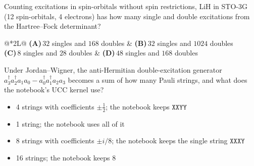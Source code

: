 \documentclass[11pt,a4paper]{article}
\newcommand{\optlabel}[1]{\textbf{(#1)}}
\newenvironment{qitem}[1]{\begin{list}{}{\setlength{\leftmargin}{3.3em}\setlength{\labelwidth}{3.1em}%
  \setlength{\labelsep}{0.2em}\setlength{\topsep}{3pt}\setlength{\parsep}{3pt}}\item[\textbf{Q.#1}\hfill]}{\end{list}}
\newcommand{\qsep}{\par\vspace{2pt}{\color{black!15}\hrule}\vspace{4pt}}
\begin{document}
\begin{qitem}{66}
Counting excitations in spin-orbitals without spin restrictions, LiH in STO-3G (12 spin-orbitals, 4 electrons) has how many single and double
excitations from the Hartree--Fock determinant?
\par\smallskip\noindent\begin{tabularx}{\linewidth}{@{}*{2}{L}@{}}
\optlabel{A}\,$32$ singles and $168$ doubles & \optlabel{B}\,$32$ singles and $1024$ doubles \\[3pt]
\optlabel{C}\,$8$ singles and $28$ doubles & \optlabel{D}\,$48$ singles and $168$ doubles
\end{tabularx}
\end{qitem}
\qsep

\begin{qitem}{67}
Under Jordan--Wigner, the anti-Hermitian double-excitation generator $a_3^\dagger a_2^\dagger a_1a_0 - a_0^\dagger a_1^\dagger a_2a_3$ becomes a sum of how many Pauli strings,
and what does the notebook's UCC kernel use?
\begin{itemize}[leftmargin=2.6em, labelsep=0.4em, itemsep=2pt, topsep=3pt]
\item[\optlabel{A}] 4 strings with coefficients $\pm\tfrac12$; the notebook keeps $\texttt{XXYY}$
\item[\optlabel{B}] 1 string; the notebook uses all of it
\item[\optlabel{C}] 8 strings with coefficients $\pm i/8$; the notebook keeps the single string $\texttt{XXXY}$
\item[\optlabel{D}] 16 strings; the notebook keeps 8
\end{itemize}
\end{qitem}
\qsep
\end{document}
